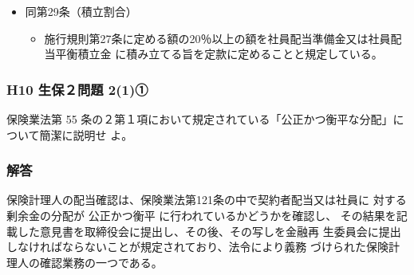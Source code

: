 \documentclass[report,gutter=10mm,fore-edge=10mm,uplatex,dvipdfmx]{jlreq}
\begin{document}
\begin{enumerate} [＊]
\begin{itemize}
\begin{itemize}
\item 社員に対する剰余金の分配をするために積み立てる準備金は、①社員配当準備金、および②
 社員配当平衡積立金とする。
\item 社員配当準備金は、社員に対する剰余金の分配をするための準備金として、貸借対照表上、
 負債の部に計上する。
\item 社員配当準備金の積立限度は次の合計額とする。
\begin{enumerate} [ ]
\item   ①積立配当の額
\item  ②未払配当の額（決算期においては翌朝配当所要額を含む。）
\item  ③全件消滅時配当の額
\item  ④その他①〜③に準ずるものとして保険料及び責任準備金の算出方法書に定める方法によ
  り計算した額
\end{enumerate}
\item 社員配当平衡積立金は、社員に対する剰余金の分配の額を安定させることを目的とする任意
 積立金として、貸借対照表上、資本の部に計上する。
\item 社員配当準備金または社員配当平衡積立金を取崩した場合は、取崩額の合計から社員に対す
 る剰余金の分配に充てた金額を控除した残額を社員配当準備金または社員配当平衡積立金
 に積み立てなければならない。ただし、損失のてん補、基金利息の支払い、損失てん補準備
 金の積立または基金償報積立金の積立に充てる場合を除く。
\end{itemize}
 \item 同第29条（積立割合）
\begin{itemize}
 \item 施行規則第27条に定める額の20％以上の額を社員配当準備金又は社員配当平衡積立金
 に積み立てる旨を定款に定めることと規定している。
\end{itemize}
\end{itemize}
\end{enumerate}

\subsubsection{H10 生保２問題 2(1)①}
保険業法第 55 条の２第１項において規定されている「公正かつ衡平な分配」について簡潔に説明せ
よ。
\subsubsection{解答}

保険計理人の配当確認は、保険業法第121条の中で契約者配当又は社員に
対する剰余金の分配が
公正かつ衡平
に行われているかどうかを確認し、
その結果を記載した意見書を取締役会に提出し、その後、その写しを金融再
生委員会に提出しなければならないことが規定されており、法令により義務
づけられた保険計理人の確認業務の一つである。
\end{document}
